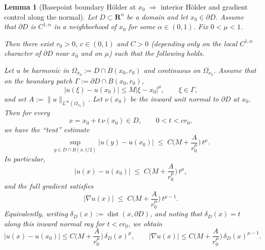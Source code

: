 \documentclass{amsart}
\newtheorem{lemma}[theorem]{Lemma}
\newcommand{\dist}{\operatorname{dist}}
\begin{document}
\begin{lemma}[Basepoint boundary H\"older at $x_0$ $\Rightarrow$ interior H\"older and gradient control along the normal]
\label{lem:anchored_holder_to_grad_normal}
Let $D\subset\mathbf R^n$ be a domain and let $x_0\in\partial D$.
Assume that $\partial D$ is $C^{1,\alpha}$ in a neighborhood of $x_0$ for some $\alpha\in(0,1)$.
Fix $0<\mu< 1$.

Then there exist $r_0>0$, $c\in(0,1)$ and $C>0$ (depending only on the local $C^{1,\alpha}$ character
of $\partial D$ near $x_0$ and on $\mu$) such that the following holds.

Let $u$ be harmonic in $\Omega_{x_0}:=D\cap B(x_0,r_0)$ and continuous on $\overline{\Omega_{x_0}}$.
Assume that on the boundary patch $\Gamma:=\partial D\cap B(x_0,r_0)$,
\begin{equation}\label{eq:anchored_holder_bd_combined}
|u(\xi)-u(x_0)|\le M|\xi-x_0|^\mu,\qquad \xi\in\Gamma,
\end{equation}
and set $A:=\|u\|_{L^\infty(\Omega_{x_0})}$.
Let $\nu(x_0)$ be the inward unit normal to $\partial D$ at $x_0$.
\\
Then for every
\[
x=x_0+t\,\nu(x_0)\in D,\qquad 0<t<cr_0,
\]
we have the ``tent'' estimate
\begin{equation}\label{eq:tent_holder_combined}
\sup_{y\in D\cap B(x,t/2)} |u(y)-u(x_0)|
\;\le\; C\Big(M+\frac{A}{r_0^\mu}\Big)\,t^\mu.
\end{equation}
In particular,
\begin{equation}\label{eq:holder_normal_combined}
|u(x)-u(x_0)|
\;\le\; C\Big(M+\frac{A}{r_0^\mu}\Big)\,t^\mu,
\end{equation}
and the full gradient satisfies
\begin{equation}\label{eq:grad_normal_combined}
|\nabla u(x)|
\;\le\; C\Big(M+\frac{A}{r_0^\mu}\Big)\,t^{\mu-1}.
\end{equation}
Equivalently, writing $\delta_D(x):=\dist(x,\partial D)$, and noting that
$\delta_D(x)=t$ along this inward normal ray for $t<cr_0$, we obtain
\[
|u(x)-u(x_0)|\le C\Big(M+\frac{A}{r_0^\mu}\Big)\,\delta_D(x)^\mu,
\qquad
|\nabla u(x)|\le C\Big(M+\frac{A}{r_0^\mu}\Big)\,\delta_D(x)^{\mu-1}.
\]
\end{lemma}
\end{document}
